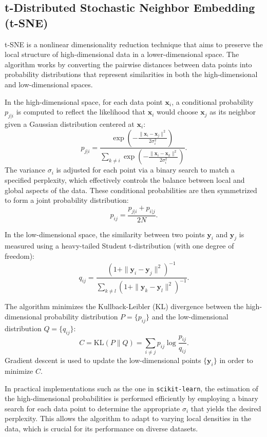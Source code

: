 \documentclass[12pt]{article}
\begin{document}
\subsection{t-Distributed Stochastic Neighbor Embedding (t-SNE)}
t-SNE is a nonlinear dimensionality reduction technique that aims to preserve the local structure of high-dimensional data in a lower-dimensional space. The algorithm works by converting the pairwise distances between data points into probability distributions that represent similarities in both the high-dimensional and low-dimensional spaces. 

In the high-dimensional space, for each data point \(\bm{x}_i\), a conditional probability \(p_{j|i}\) is computed to reflect the likelihood that \(\bm{x}_i\) would choose \(\bm{x}_j\) as its neighbor given a Gaussian distribution centered at \(\bm{x}_i\):
\[
p_{j|i} = \frac{\exp\left(-\frac{\|\bm{x}_i - \bm{x}_j\|^2}{2\sigma_i^2}\right)}{\sum_{k \neq i} \exp\left(-\frac{\|\bm{x}_i - \bm{x}_k\|^2}{2\sigma_i^2}\right)}.
\]
The variance \(\sigma_i\) is adjusted for each point via a binary search to match a specified perplexity, which effectively controls the balance between local and global aspects of the data. These conditional probabilities are then symmetrized to form a joint probability distribution:
\[
p_{ij} = \frac{p_{j|i} + p_{i|j}}{2N}.
\]

In the low-dimensional space, the similarity between two points \(\bm{y}_i\) and \(\bm{y}_j\) is measured using a heavy-tailed Student t-distribution (with one degree of freedom):
\[
q_{ij} = \frac{\left(1 + \|\bm{y}_i - \bm{y}_j\|^2\right)^{-1}}{\sum_{k \neq l} \left(1 + \|\bm{y}_k - \bm{y}_l\|^2\right)^{-1}}.
\]

The algorithm minimizes the Kullback-Leibler (KL) divergence between the high-dimensional probability distribution \(P = \{p_{ij}\}\) and the low-dimensional distribution \(Q = \{q_{ij}\}\):
\[
C = \text{KL}(P \parallel Q) = \sum_{i \neq j} p_{ij} \log \frac{p_{ij}}{q_{ij}}.
\]
Gradient descent is used to update the low-dimensional points \(\{\bm{y}_i\}\) in order to minimize \(C\).

In practical implementations such as the one in \texttt{scikit-learn}, the estimation of the high-dimensional probabilities is performed efficiently by employing a binary search for each data point to determine the appropriate \(\sigma_i\) that yields the desired perplexity. This allows the algorithm to adapt to varying local densities in the data, which is crucial for its performance on diverse datasets.
\end{document}
